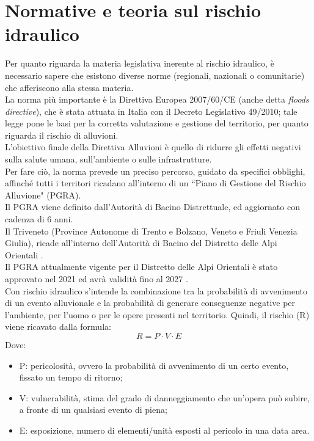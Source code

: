 \section{Normative e teoria sul rischio idraulico}
\label{section:normative}
Per quanto riguarda la materia legislativa inerente al rischio idraulico, è necessario sapere che esistono diverse norme (regionali, nazionali o comunitarie) che afferiscono alla stessa materia.\\
La norma più importante è la Direttiva Europea 2007/60/CE (anche detta \textit{floods directive}), che è stata attuata in Italia con il Decreto Legislativo 49/2010; tale legge pone le basi per la corretta valutazione e gestione del territorio, per quanto riguarda il rischio di alluvioni.\\
L'obiettivo finale della Direttiva Alluvioni è quello di ridurre gli effetti negativi sulla salute umana, sull'ambiente o sulle infrastrutture.\\
Per fare ciò, la norma prevede un preciso percorso, guidato da specifici obblighi, affinché tutti i territori ricadano all'interno di un ``Piano di Gestione del Rischio Alluvione" (PGRA).\\
Il PGRA viene definito dall'Autorità di Bacino Distrettuale, ed aggiornato con cadenza di 6 anni.\\
Il Triveneto (Province Autonome di Trento e Bolzano, Veneto e Friuli Venezia Giulia), ricade all'interno dell'Autorità di Bacino del Distretto delle Alpi Orientali \cite{distrettoalpiorientali}.\\
Il PGRA attualmente vigente per il Distretto delle Alpi Orientali è stato approvato nel 2021 ed avrà validità fino al 2027 \cite{pgra}.\\
Con rischio idraulico s'intende la combinazione tra la probabilità di avvenimento di un evento alluvionale e la probabilità di generare conseguenze negative per l'ambiente, per l'uomo o per le opere presenti nel territorio. Quindi, il rischio (R) viene ricavato dalla formula:
\begin{equation}
    R = P \cdot V \cdot E
\end{equation}
Dove: 
\begin{itemize}
    \item P: pericolosità, ovvero la probabilità di avvenimento di un certo evento, fissato un tempo di ritorno;
    \item V: vulnerabilità, stima del grado di danneggiamento che un'opera può subire, a fronte di un qualsiasi evento di piena;
    \item E: esposizione, numero di elementi/unità esposti al pericolo in una data area.
\end{itemize}

